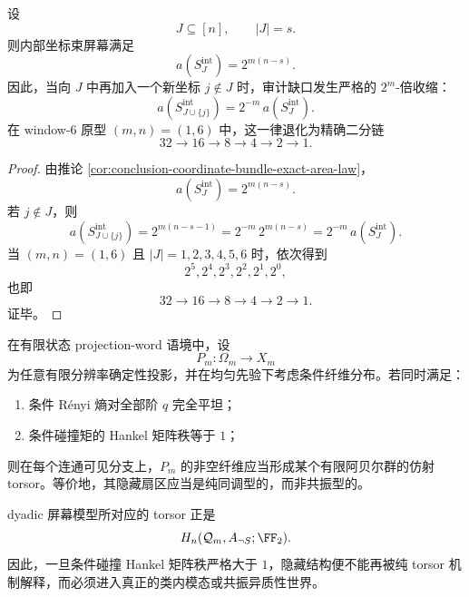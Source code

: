 \begin{theorem}\label{thm:conclusion-coordinate-bundle-dyadic-block-law}
设
\[
J\subseteq [n],
\qquad
|J|=s.
\]
则内部坐标束屏幕满足
\[
a\!\left(S_J^{\mathrm{int}}\right)=2^{m(n-s)}.
\]
因此，当向 \(J\) 中再加入一个新坐标 \(j\notin J\) 时，审计缺口发生严格的 \(2^m\)-倍收缩：
\[
a\!\left(S_{J\cup\{j\}}^{\mathrm{int}}\right)
=
2^{-m}\,a\!\left(S_J^{\mathrm{int}}\right).
\]
在 window-\(6\) 原型 \((m,n)=(1,6)\) 中，这一律退化为精确二分链
\[
32\to 16\to 8\to 4\to 2\to 1.
\]
\end{theorem}
\begin{proof}
由推论 \ref{cor:conclusion-coordinate-bundle-exact-area-law}，
\[
a\!\left(S_J^{\mathrm{int}}\right)=2^{m(n-s)}.
\]
若 \(j\notin J\)，则
\[
a\!\left(S_{J\cup\{j\}}^{\mathrm{int}}\right)
=
2^{m(n-s-1)}
=
2^{-m}\,2^{m(n-s)}
=
2^{-m}\,a\!\left(S_J^{\mathrm{int}}\right).
\]
当 \((m,n)=(1,6)\) 且 \(|J|=1,2,3,4,5,6\) 时，依次得到
\[
2^5,2^4,2^3,2^2,2^1,2^0,
\]
也即
\[
32\to 16\to 8\to 4\to 2\to 1.
\]
证毕。
\end{proof}

\begin{conjecture}\label{conj:conclusion-screen-renyi-flatness-rigidity}
在有限状态 projection-word 语境中，设
\[
P_m:\Omega_m\to X_m
\]
为任意有限分辨率确定性投影，并在均匀先验下考虑条件纤维分布。若同时满足：
\begin{enumerate}
  \item 条件 R\'enyi 熵对全部阶 \(q\) 完全平坦；
  \item 条件碰撞矩的 Hankel 矩阵秩等于 \(1\)；
\end{enumerate}
则在每个连通可见分支上，\(P_m\) 的非空纤维应当形成某个有限阿贝尔群的仿射 torsor。等价地，其隐藏扇区应当是纯同调型的，而非共振型的。

dyadic 屏幕模型所对应的 torsor 正是
\[
H_n(\mathcal Q_m,A_{\neg S};\FF_2).
\]
因此，一旦条件碰撞 Hankel 矩阵秩严格大于 \(1\)，隐藏结构便不能再被纯 torsor 机制解释，而必须进入真正的类内模态或共振异质性世界。
\end{conjecture}

\endinput
